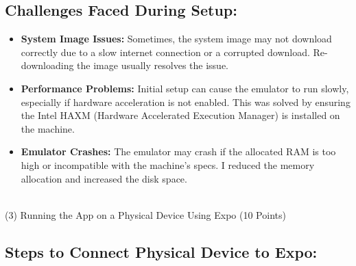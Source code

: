 \documentclass{article}
\begin{document}
\subsection*{Challenges Faced During Setup:}

\begin{itemize}
    \item \textbf{System Image Issues:} Sometimes, the system image may not download correctly due to a slow internet connection or a corrupted download. Re-downloading the image usually resolves the issue.
    \item \textbf{Performance Problems:} Initial setup can cause the emulator to run slowly, especially if hardware acceleration is not enabled. This was solved by ensuring the Intel HAXM (Hardware Accelerated Execution Manager) is installed on the machine.
    \item \textbf{Emulator Crashes:} The emulator may crash if the allocated RAM is too high or incompatible with the machine's specs. I reduced the memory allocation and increased the disk space.\\
\end{itemize}
\\

(3) Running the App on a Physical Device Using Expo (10 Points)
\subsection*{Steps to Connect Physical Device to Expo:}
\end{document}
